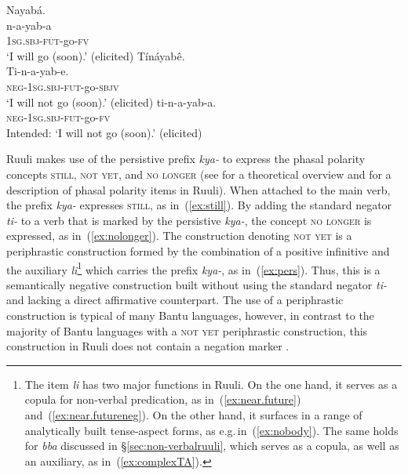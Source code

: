 \documentclass[output=paper,colorlinks,citecolor=brown,draftmode]{langscibook}
\begin{document}
\ea\label{ex:standardasyconstr}\label{ex:ruulietal:3}
\begin{xlist}
\ex \label{ex:near.future}
	\glll   Nayabá.\\  
	        n-a-yab-a\\
		    1\textsc{sg.sbj}-\textsc{fut}-go-\textsc{fv}\\
	\glt ‘I will go (soon).’  (elicited)
\ex \label{ex:near.futureneg}
	\glll   Tínáyabê.\\
	        Ti-n-a-yab-e.\\
		    \textsc{neg}-1\textsc{sg.sbj}-\textsc{fut}-go-\textsc{sbjv}\\
	\glt ‘I will not go (soon).’ 	 (elicited)
\ex \label{ex:near.futureasterix}
	\gll *ti-n-a-yab-a.\\
		\textsc{neg}-1\textsc{sg.sbj}-\textsc{fut}-go-\textsc{fv} \\
\glt Intended: ‘I will not go (soon).’ (elicited)
\end{xlist}
\z

Ruuli makes use of the persistive prefix \textit{kya-} to express the phasal polarity concepts \textsc{still}, \textsc{not yet}, and \textsc{no longer} (see \citealt{Kramer2021} for a theoretical overview and  \citealt{MolochievaEtAl2021} for a description of phasal polarity items in Ruuli). 
When attached to the main verb, the prefix \textit{kya-} expresses \textsc{still}, as in~(\ref{ex:still}). 
By adding the standard negator \textit{ti-} to a verb that is marked by the persistive \mbox{\textit{kya-},} the concept \textsc{no longer} is expressed, as in~(\ref{ex:nolonger}). 
The construction denoting \textsc{not yet} is a periphrastic construction formed by the combination of a positive infinitive and the auxiliary \textit{li}\footnote{The item \textit{li} has two major functions in Ruuli. 
On the one hand, it serves as a copula for non-verbal predication, as in~(\ref{ex:near.future}) and~(\ref{ex:near.futureneg}). 
On the other hand, it surfaces in a range of analytically built tense-aspect forms, as e.g.\,in~(\ref{ex:nobody}). 
The same holds for \emph{bba} discussed in §\ref{sec:non-verbalruuli}, which serves as a copula, as well as an auxiliary, as in~(\ref{ex:complexTA}).}
which carries the prefix \textit{kya-}, as in~(\ref{ex:pers}). 
Thus, this is a semantically negative construction built without using the standard negator \textit{ti-} and lacking a direct affirmative counterpart. 
The use of a periphrastic construction is typical of many Bantu languages, however, in contrast to the majority of Bantu languages with a \textsc{not yet} periphrastic construction, this construction in Ruuli does not contain a negation marker \citep{VeselinovaDevos2021}. 
\end{document}
